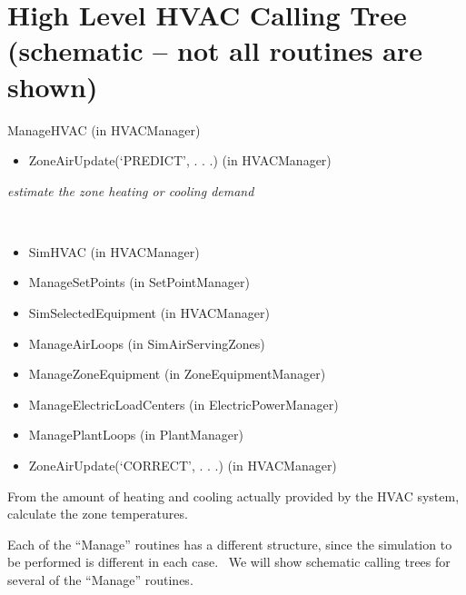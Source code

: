 \section{High Level HVAC Calling Tree (schematic -- not all routines are shown)}\label{high-level-hvac-calling-tree-schematic-not-all-routines-are-shown}

ManageHVAC (in HVACManager)

\begin{itemize}
\tightlist
\item
  ZoneAirUpdate(`PREDICT', . . .) (in HVACManager)
\end{itemize}

\emph{estimate the zone heating or cooling demand}

\emph{~}

\begin{itemize}
\item
  SimHVAC (in HVACManager)
\item
  ManageSetPoints (in SetPointManager)
\item
  SimSelectedEquipment (in HVACManager)
\item
  ManageAirLoops (in SimAirServingZones)
\item
  ManageZoneEquipment (in ZoneEquipmentManager)
\item
  ManageElectricLoadCenters (in ElectricPowerManager)
\item
  ManagePlantLoops (in PlantManager)
\item
  ZoneAirUpdate(`CORRECT', . . .) (in HVACManager)
\end{itemize}

From the amount of heating and cooling actually provided by the HVAC system, calculate the zone temperatures.

Each of the ``Manage'' routines has a different structure, since the simulation to be performed is different in each case.~ We will show schematic calling trees for several of the ``Manage'' routines.
